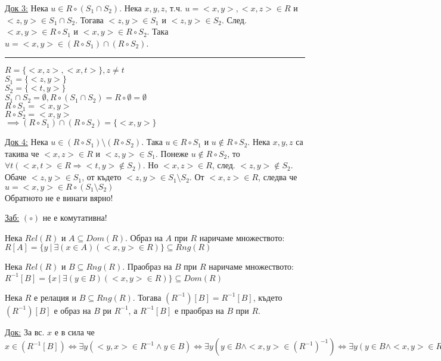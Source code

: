 \documentclass[fleqn, titlepage, 12pt]{report}
\begin{document}
\underline{Док 3:} Нека $u \in R \circ (S_1 \cap S_2)$. Нека $x,y,z$,
т.ч. $u = <x,y>, <x,z> \in R$ и $<z,y> \in S_1 \cap S_2$. Тогава $<z,y> \in S_1$ и $<z,y> \in S_2$.
След. $<x,y> \in R \circ S_1$ и $<x,y> \in R \circ S_2$. Така $u = <x,y> \in (R \circ S_1) \cap (R \circ S_2)$.
\bigbreak
\hrule
\bigbreak
$R = \{ <x,z>, <x,t>\}, z \neq t$\\
$S_1 = \{ <z,y>\}$\\
$S_2 = \{ <t,y>\}$\\
$S_1 \cap S_2 = \emptyset, R \circ (S_1 \cap S_2) = R \circ \emptyset = \emptyset$\\
$R \circ S_1 = {<x,y>}$\\
$R \circ S_2 = {<x,y>}$\\
$\implies (R \circ S_1) \cap (R \circ S_2) = \{ <x,y>\}$
\bigbreak

\underline{Док 4:} Нека $u \in (R \circ S_1) \setminus (R \circ S_2)$. Така $u \in R \circ S_1$ и $u \notin R \circ S_2$.
Нека $x,y,z$ са такива че $<x,z> \in R$ и $<z,y> \in S_1$. Понеже $u \notin R \circ S_2$,
то $\forall{t}(<x,t> \in R \Rightarrow <t,y> \notin S_2)$. Но $<x,z> \in R$, след. $<z,y> \notin S_2$.
Обаче $<z,y> \in S_1$, от където $<z,y> \in S_1 \setminus S_2$. От $<x,z> \in R$,
следва че $u = <x,y> \in R \circ (S_1 \setminus S_2)$\\
Обратното не е винаги вярно!
\bigbreak

\underline{Заб:} $ (\circ) $ не е комутативна!
\bigbreak

 Нека $Rel(R)$ и $A \subseteq Dom(R)$. Образ на $A$ при $R$ наричаме множеството:\\
$R[A] = \{y\ |\ \exists{(x \in A)}(<x,y> \in R)\} \subseteq Rng(R)$
\bigbreak

 Нека $Rel(R)$ и $B \subseteq Rng(R)$. Праобраз на $B$ при $R$ наричаме множеството:\\
$R^{-1}[B ]= \{x\ |\ \exists{(y \in B)}(<x,y> \in R)\} \subseteq Dom(R)$
\bigbreak

 Нека $R$ е релация и $B \subseteq Rng(R)$. Тогава $(R^{-1})[B] = R^{-1}[B] $, където
$(R^{-1})[B]$ е образ на $B$ ри $R^{-1}$, а $R^{-1}[B]$ е праобраз на $B$ при $R$.
\bigbreak

\underline{Док:} За вс. $x$ е в сила че $x \in (R^{-1}[B]) \Longleftrightarrow \exists{y}(<y,x> \in R^{-1} \land y \in B)
\Longleftrightarrow \exists{y}(y \in B \land  <x,y> \in (R^{-1})^{-1}) \Longleftrightarrow \exists{y}(y \in B \land <x,y> \in R) \Longleftrightarrow x \in (R)^{-1}[B]$
\bigbreak
\end{document}
